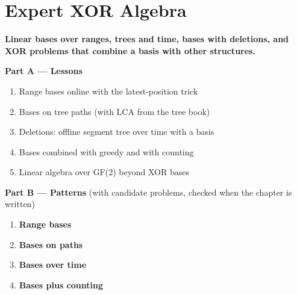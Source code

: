 \chapter{Expert XOR Algebra}
\label{ch:expert_basis}

\begin{tcolorbox}[enhanced, colback=white, colframe=secondaryblue, boxrule=1pt, arc=2mm]
\textbf{\large\textcolor{primaryblue}{Linear bases over ranges, trees and time, bases with deletions, and XOR problems that combine a basis with other structures.}}
\end{tcolorbox}


\begin{plannedbox}
\textbf{Part A --- Lessons}
\begin{enumerate}[leftmargin=*, label=\textbf{A\arabic*.}, itemsep=1pt]
    \item Range bases online with the latest-position trick
    \item Bases on tree paths (with LCA from the tree book)
    \item Deletions: offline segment tree over time with a basis
    \item Bases combined with greedy and with counting
    \item Linear algebra over GF(2) beyond XOR bases
\end{enumerate}
\textbf{Part B --- Patterns} (with candidate problems, checked when the chapter is written)
\begin{enumerate}[leftmargin=*, label=\textbf{P\arabic*.}, itemsep=1pt]
    \item \textbf{Range bases}
    \item \textbf{Bases on paths}
    \item \textbf{Bases over time}
    \item \textbf{Bases plus counting}
\end{enumerate}
\end{plannedbox}
